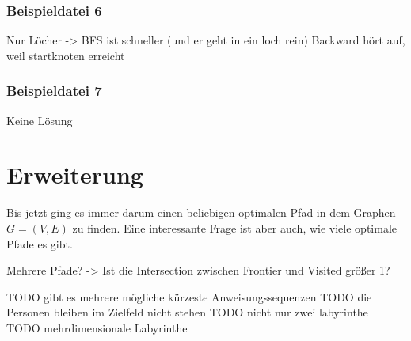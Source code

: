 \documentclass[a4paper,10pt,ngerman]{scrartcl}
\begin{document}
    \subsubsection{Beispieldatei 6}
    Nur Löcher -> BFS ist schneller (und er geht in ein loch rein)
    Backward hört auf, weil startknoten erreicht

    \subsubsection{Beispieldatei 7}
    Keine Lösung


    \section{Erweiterung}
    Bis jetzt ging es immer darum einen beliebigen optimalen Pfad in dem Graphen $G = (V, E)$ zu finden.
    Eine interessante Frage ist aber auch, wie viele optimale Pfade es gibt.

    Mehrere Pfade? -> Ist die Intersection zwischen Frontier und Visited größer 1?


    TODO gibt es mehrere mögliche kürzeste Anweisungssequenzen
    TODO die Personen bleiben im Zielfeld nicht stehen
    TODO nicht nur zwei labyrinthe
    TODO mehrdimensionale Labyrinthe
\end{document}
